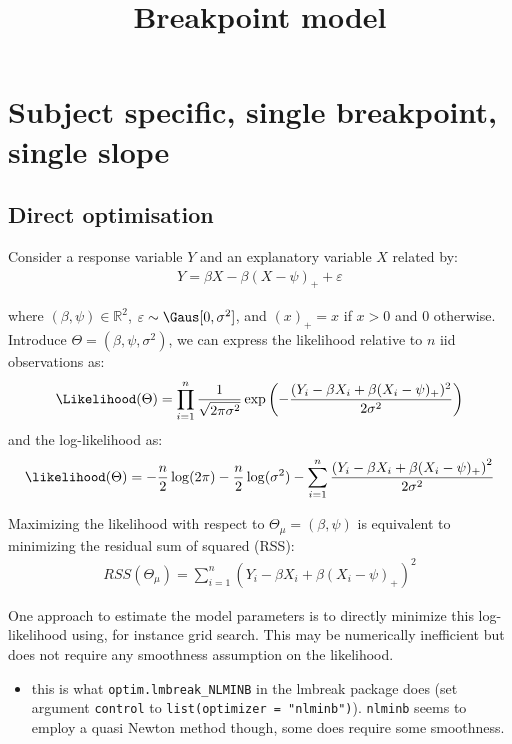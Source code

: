 \documentclass[12pt]{article}
\date{}
\title{Breakpoint model}
\newcommand\Real{\mathbb{R}}
\begin{document}
\maketitle
\section{Subject specific, single breakpoint, single slope}
\label{sec:orgdfa667d}

\subsection{Direct optimisation}
\label{sec:org489cc30}

Consider a response variable \(Y\) and an explanatory variable \(X\)
related by:
\begin{align*}
Y = \beta X - \beta (X - \psi)_+ + \varepsilon
\end{align*}

\noindent where \((\beta,\psi) \in \Real^2\), \(\varepsilon
\sim \Gaus[0,\sigma^2]\), and \((x)_+=x\) if \(x>0\) and 0
otherwise. Introduce \(\Theta = (\beta,\psi,\sigma^2)\), we can
express the likelihood relative to \(n\) iid observations as:
\begin{align*}
\Likelihood(\Theta) = \prod_{i=1}^n \frac{1}{\sqrt{2\pi\sigma^2}}\exp\left(-\frac{(Y_i - \beta X_i + \beta (X_i - \psi)_+)^2}{2\sigma^2}\right)
\end{align*}
and the log-likelihood as:
\begin{align*}
\likelihood(\Theta) = - \frac{n}{2} \log(2\pi) - \frac{n}{2} \log(\sigma^2) - \sum_{i=1}^n \frac{\left(Y_i - \beta X_i + \beta (X_i - \psi)_+\right)^2}{2\sigma^2}
\end{align*}

\noindent Maximizing the likelihood with respect to \(\Theta_\mu =
(\beta,\psi)\) is equivalent to minimizing the residual sum of
squared (RSS):
\begin{align*}
RSS(\Theta_\mu) = \sum_{i=1}^n (Y_i - \beta X_i + \beta (X_i - \psi)_+)^2
\end{align*}

One approach to estimate the model parameters is to directly minimize
this log-likelihood using, for instance grid search. This may be
numerically inefficient but does not require any smoothness assumption
on the likelihood.
\begin{itemize}
\item this is what \texttt{optim.lmbreak\_NLMINB} in the lmbreak package does (set
argument \texttt{control} to \texttt{list(optimizer = "nlminb")}). \texttt{nlminb} seems
to employ a quasi Newton method though, some does require some
smoothness.
\end{itemize}
\end{document}

